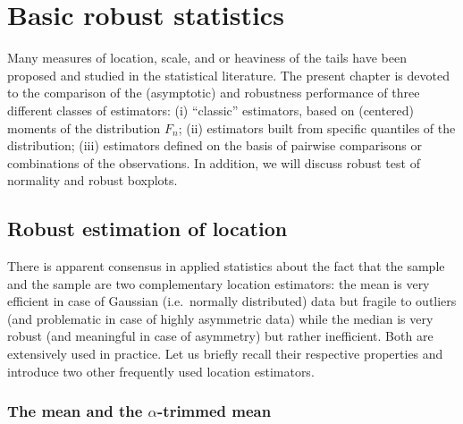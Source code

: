 
\chapter{Basic robust statistics}
\label{chap:stats}

Many measures of location, scale,  and  or
heaviness of the tails have been proposed and studied in the statistical
literature. The present chapter is devoted to the comparison of the
(asymptotic)  and robustness performance of three
different classes of estimators: (i) “classic” estimators, based on (centered)
moments of the distribution $F_n$; (ii) estimators built from specific
quantiles of the distribution; (iii) estimators defined on the basis of
pairwise comparisons or combinations of the observations. In addition, we will
discuss robust test of normality and robust boxplots.

\section{Robust estimation of location}
\label{sec:stats:location}

There is apparent consensus in applied statistics about the fact that the
sample  and the sample  are two complementary location estimators:
the mean is very efficient in case of Gaussian (i.e.\ normally distributed)
data but fragile to outliers (and problematic in case of highly asymmetric
data) while the median is very robust (and meaningful in case of asymmetry) but
rather inefficient. Both are extensively used in practice. Let us briefly
recall their respective properties and introduce two other frequently used
location estimators.

\subsection{The mean and the $\alpha$-trimmed mean}

